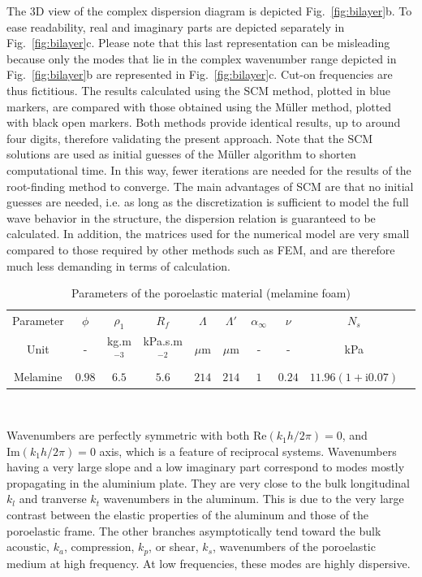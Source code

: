 The 3D view of the complex dispersion diagram is depicted Fig.~\ref{fig:bilayer}b. To ease readability, real and imaginary parts are depicted separately in Fig.~\ref{fig:bilayer}c. Please note that this last representation can be misleading because only the modes that lie in the complex wavenumber range depicted in Fig.~\ref{fig:bilayer}b are represented in Fig.~\ref{fig:bilayer}c. Cut-on frequencies are thus fictitious. The results calculated using the SCM method, plotted in blue markers, are compared with those obtained using the M\"uller method, plotted with black open markers. Both methods provide identical results, up to around four digits, therefore validating the present approach. Note that the SCM solutions are used as initial guesses of the M\"uller algorithm to shorten computational time. In this way, fewer iterations are needed for the results of the root-finding method to converge. The main advantages of SCM are that no initial guesses are needed, i.e. as long as the discretization is sufficient to model the full wave behavior in the structure, the dispersion relation is guaranteed to be calculated. In addition, the matrices used for the numerical model are very small compared to those required by other methods such as FEM, and are therefore much less demanding in terms of calculation.
    \begin{table}
        \centering
             \caption{Parameters of the poroelastic material (melamine foam)}
        \label{tab:poroelastic_params}

            \begin{tabular}{cccccccccc}
            \hline
            Parameter  & $\phi$ & $\rho_1$    & $R_f$          & $\Lambda$ & $\Lambda'$ & $\alpha_\infty$ & $\nu$  & $N_s$    \\
            Unit       & -      & kg.m$^{-3}$ & kPa.s.m$^{-2}$ & $\mu$m    & $\mu$m     & -               & -      & kPa            \\
            \hline
            Melamine   & $0.98$ & $6.5$       & $5.6$          & $214$     & $214$      & $1$             & $0.24$ & $11.96\left(1+\textrm{i0.07} \right)$     \\
            \hline
        \end{tabular}\\[2em]        
        \end{table}

    Wavenumbers are perfectly symmetric with both $\textrm{Re}\left(k_1h/2\pi \right)=0$, and $\textrm{Im}\left(k_1h/2\pi \right)=0$ axis, which is a feature of reciprocal systems. Wavenumbers having a very large slope and a low imaginary part correspond to modes mostly propagating in the aluminium plate. They are very close to the bulk longitudinal $k_l$ and tranverse $k_t$ wavenumbers in the aluminum. This is due to the very large contrast between the elastic properties of the aluminum and those of the poroelastic frame. The other branches asymptotically tend toward the bulk acoustic, $k_a$, compression, $k_p$, or shear, $k_s$, wavenumbers of the poroelastic medium at high frequency. At low frequencies, these modes are highly dispersive. 
    
